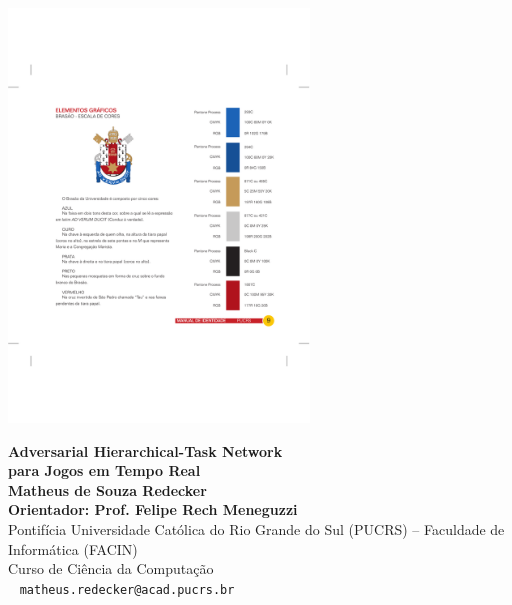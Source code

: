 \documentclass[a0,portrait]{a0poster}
\begin{document}
	
	
\begin{minipage}[t]{0.15\linewidth}
	\vspace{-13cm}
	\hspace*{2cm}
	\includegraphics[width=8cm]{fig/logoPUCRS.pdf}
\end{minipage}
\begin{minipage}[b]{0.65\linewidth}
	\begin{center}
	\veryHuge \color{NavyBlue} 
	\textbf{Adversarial Hierarchical-Task Network \\para Jogos em Tempo Real} 
	\color{Black}\\%
	\huge \textbf{Matheus de Souza Redecker} \\
	\Large \textbf{Orientador: Prof. Felipe Rech Meneguzzi}\\
	\Large Pontifícia Universidade Católica do Rio Grande do Sul (PUCRS) -- Faculdade de Informática (FACIN)\\ 
	Curso de Ciência da Computação \\
	\Large \Letter ~ \texttt{matheus.redecker@acad.pucrs.br}%
	\end{center}
\end{minipage}
\end{document}

